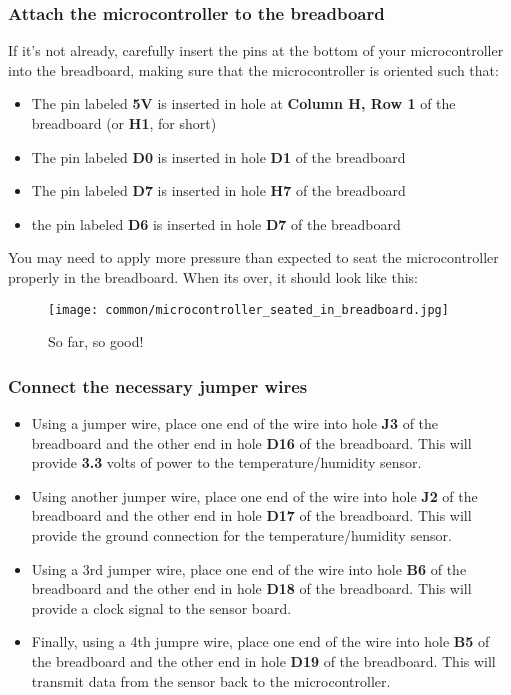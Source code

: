 \subsubsection{Attach the microcontroller to the breadboard}
If it's not already, carefully insert the pins at the bottom of your microcontroller into the breadboard, making sure that the microcontroller is oriented such that:
\begin{itemize}
    \item The pin labeled \textbf{5V} is inserted in hole at \textbf{Column H, Row 1} of the breadboard (or \textbf{H1}, for short)
    \item The pin labeled \textbf{D0} is inserted in hole \textbf{D1} of the breadboard
    \item The pin labeled \textbf{D7} is inserted in hole \textbf{H7} of the breadboard
    \item the pin labeled \textbf{D6} is inserted in hole \textbf{D7} of the breadboard
\end{itemize}
You may need to apply more pressure than expected to seat the microcontroller properly in the breadboard. When its over, it should look like this:
\begin{figure}[H]
    \centering
    \texttt{[image: common/microcontroller\_seated\_in\_breadboard.jpg]}
    \caption{So far, so good!}
\end{figure}

\subsubsection{Connect the necessary jumper wires}
\begin{itemize}
    \item Using a jumper wire, place one end of the wire into hole \textbf{J3} of the breadboard and the other end in hole \textbf{D16} of the breadboard. This will provide \textbf{3.3} volts of power to the temperature/humidity sensor.
    \item Using another jumper wire, place one end of the wire into hole \textbf{J2} of the breadboard and the other end in hole \textbf{D17} of the breadboard. This will provide the ground connection for the temperature/humidity sensor.
    \item Using a 3rd jumper wire, place one end of the wire into hole \textbf{B6} of the breadboard and the other end in hole \textbf{D18} of the breadboard. This will provide a clock signal to the sensor board.
    \item Finally, using a 4th jumpre wire, place one end of the wire into hole \textbf{B5} of the breadboard and the other end in hole \textbf{D19} of the breadboard. This will transmit data from the sensor back to the microcontroller.
\end{itemize}

